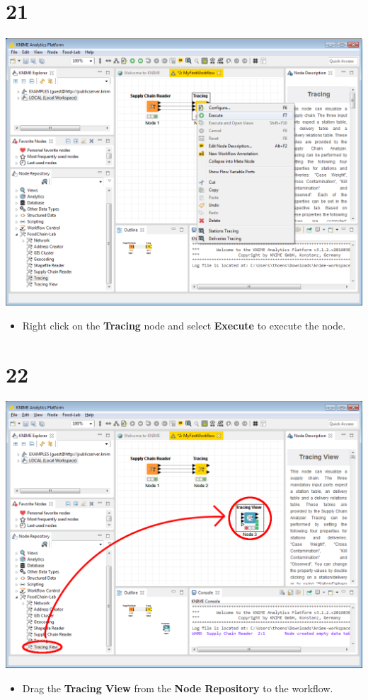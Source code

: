 \documentclass[10pt]{beamer}
\begin{document}
\section{21}
\begin{frame}
	\begin{center}
  		\includegraphics[height=0.6\textheight]{21.png}
	\end{center}
	\begin{itemize}
		\item Right click on the \textbf{Tracing} node and select \textbf{Execute} to execute the node.
	\end{itemize}
\end{frame}

\section{22}
\begin{frame}
	\begin{center}
  		\includegraphics[height=0.6\textheight]{22.png}
	\end{center}
	\begin{itemize}
		\item Drag the \textbf{Tracing View} from the \textbf{Node Repository} to the workflow.
	\end{itemize}
\end{frame}
\end{document}
